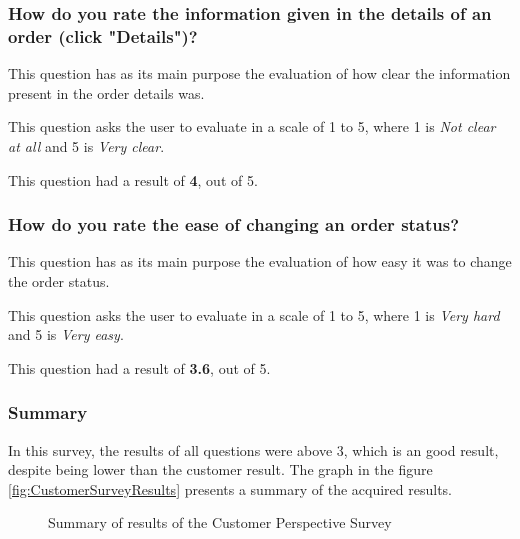 \subsubsection{How do you rate the information given in the details of an order (click "Details")?}

This question has as its main purpose the evaluation of how clear the information present in the order details was.
\par 
This question asks the user to evaluate in a scale of 1 to 5, where 1 is \textit{Not clear at all} and 5 is \textit{Very clear}. 
\par
This question had a result of \textbf{4}, out of 5.

\subsubsection{How do you rate the ease of changing an order status?}

This question has as its main purpose the evaluation of how easy it was to change the order status.
\par 
This question asks the user to evaluate in a scale of 1 to 5, where 1 is \textit{Very hard} and 5 is \textit{Very easy}. 
\par
This question had a result of \textbf{3.6}, out of 5.

\subsubsection{Summary}
In this survey, the results of all questions were above 3, which is an good result, despite being lower than the customer result. The graph in the figure \ref{fig:CustomerSurveyResults} presents a summary of the acquired results.


\begin{figure}[!ht]
\centering
\caption{Summary of results of the Customer Perspective Survey}
\label{fig:ServiceProviderSurveyResults}
\end{figure}
\pagebreak
